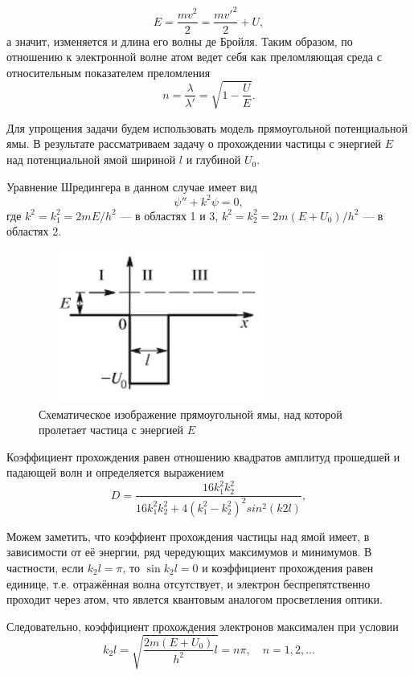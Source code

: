 \documentclass[12pt]{article}
\begin{document}
\[
	E = \frac{m v^2}{2} = \frac{m v'^2}{2} + U,
\]
а значит, изменяется и длина его волны де Бройля. Таким образом, по отношению к электронной волне атом ведет себя как преломляющая среда с относительным показателем преломления 
\begin{equation}
	n = \frac{\lambda}{\lambda'} = \sqrt{1 - \frac{U}{E}}.
\end{equation}
\par
	Для упрощения задачи будем использовать модель прямоугольной потенциальной ямы. В результате рассматриваем задачу о прохождении частицы с энергией $E$ над потенциальной ямой шириной $l$ и глубиной $U_0$.
\par
	Уравнение Шредингера в данном случае имеет вид
\[
	\psi'' + k^2 \psi = 0,
\]
где $k^2 = k_1^2 = 2 m E / h^2$ --- в областях 1 и 3, $k^2 = k_2^2 = 2 m (E + U_0) / h^2$ --- в областях 2.
\begin{figure}[h!]
	\centering
	\includegraphics[width = 8cm, height = 5cm]{image4.png}
	\caption{Схематическое изображение прямоугольной ямы, над которой пролетает частица с энергией $E$}
\end{figure}
\par
	Коэффициент прохождения равен отношению квадратов амплитуд прошедшей и падающей волн и определяется выражением
\begin{equation}
	D = \frac{16 k_1^2 k_2^2}{16 k_1^2 k_2^2 + 4 (k_1^2 - k_2^2)^2 sin^2(k2 l)},
\end{equation}
\par
	Можем заметить, что коэффиент прохождения частицы над ямой имеет, в зависимости от её энергии, ряд чередующих максимумов и минимумов. В частности, если $k_2 l = \pi$, то $\sin k_2 l = 0$ и коэффициент прохождения равен единице, т.е. отражённая волна отсутствует, и электрон беспрепятственно проходит через атом, что явлется квантовым аналогом просветления оптики.
\par
	Следовательно, коэффициент прохождения электронов максимален при условии
\begin{equation}
	k_2 l = \sqrt{\frac{2 m (E + U_0)}{h^2} l} = n \pi, \quad n = 1, 2, \dots
\end{equation}
\end{document}
